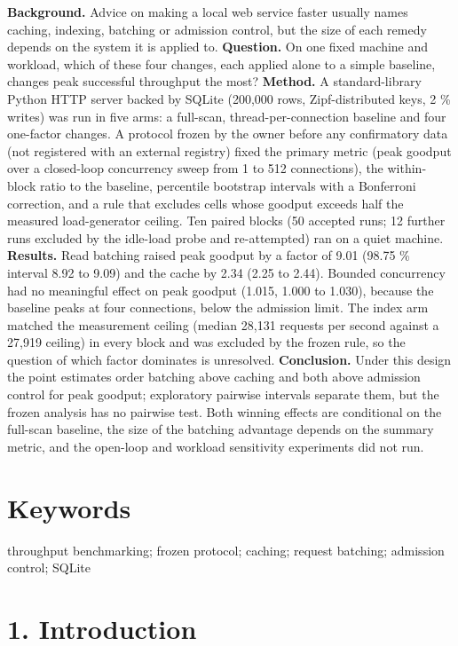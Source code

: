\documentclass[
]{article}
\begin{document}
\textbf{Background.} Advice on making a local web service faster usually
names caching, indexing, batching or admission control, but the size of
each remedy depends on the system it is applied to. \textbf{Question.}
On one fixed machine and workload, which of these four changes, each
applied alone to a simple baseline, changes peak successful throughput
the most? \textbf{Method.} A standard-library Python HTTP server backed
by SQLite (200,000 rows, Zipf-distributed keys, 2 \% writes) was run in
five arms: a full-scan, thread-per-connection baseline and four
one-factor changes. A protocol frozen by the owner before any
confirmatory data (not registered with an external registry) fixed the
primary metric (peak goodput over a closed-loop concurrency sweep from 1
to 512 connections), the within-block ratio to the baseline, percentile
bootstrap intervals with a Bonferroni correction, and a rule that
excludes cells whose goodput exceeds half the measured load-generator
ceiling. Ten paired blocks (50 accepted runs; 12 further runs excluded
by the idle-load probe and re-attempted) ran on a quiet machine.
\textbf{Results.} Read batching raised peak goodput by a factor of 9.01
(98.75 \% interval 8.92 to 9.09) and the cache by 2.34 (2.25 to 2.44).
Bounded concurrency had no meaningful effect on peak goodput (1.015,
1.000 to 1.030), because the baseline peaks at four connections, below
the admission limit. The index arm matched the measurement ceiling
(median 28,131 requests per second against a 27,919 ceiling) in every
block and was excluded by the frozen rule, so the question of which
factor dominates is unresolved. \textbf{Conclusion.} Under this design
the point estimates order batching above caching and both above
admission control for peak goodput; exploratory pairwise intervals
separate them, but the frozen analysis has no pairwise test. Both
winning effects are conditional on the full-scan baseline, the size of
the batching advantage depends on the summary metric, and the open-loop
and workload sensitivity experiments did not run.

\section{Keywords}\label{keywords}

throughput benchmarking; frozen protocol; caching; request batching;
admission control; SQLite

\section{1. Introduction}\label{introduction}
\end{document}
